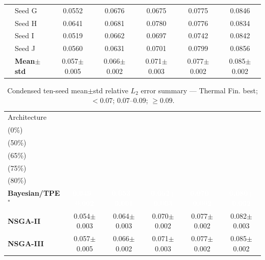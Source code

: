 \begin{table}[H]
{\begin{tabular}{@{}llccccc@{}}
  & Seed G & {\small 0.0552} & {\small 0.0676} & {\small 0.0675} & {\small 0.0775} & {\small 0.0846} \\
  & Seed H & {\small 0.0641} & {\small 0.0681} & {\small 0.0780} & {\small 0.0776} & {\small 0.0834} \\
  & Seed I & {\small 0.0519} & {\small 0.0662} & {\small 0.0697} & {\small 0.0742} & {\small 0.0842} \\
  & Seed J & {\small 0.0560} & {\small 0.0631} & {\small 0.0701} & {\small 0.0799} & {\small 0.0856} \\
 & \textbf{Mean$\pm$std} & \cellcolor{ForestGreen!25}0.057$\pm$0.005 & \cellcolor{ForestGreen!25}0.066$\pm$0.002 & \cellcolor{YellowGreen!30}0.071$\pm$0.003 & \cellcolor{YellowGreen!30}0.077$\pm$0.002 & \cellcolor{YellowGreen!30}0.085$\pm$0.002 \\
\bottomrule
\end{tabular}
}
\end{table}

\begin{table}[H]
\centering\small\setlength{\tabcolsep}{4pt}
\caption{Condensed ten-seed mean$\pm$std relative $L_2$ error summary --- Thermal Fin.
\phantom{x} best; \phantom{x} ${<}0.07$;
\phantom{x} $0.07$--$0.09$; \phantom{x} ${\geq}0.09$.}
\label{tab:l2_summary_thermal_fin}
\begin{tabular}{@{}lccccc@{}}
\toprule
Architecture & \makecell{$k{=}1$\\(0\%)} & \makecell{$k{=}2$\\(50\%)} & \makecell{$k{=}3$\\(65\%)} & \makecell{$k{=}4$\\(75\%)} & \makecell{$k{=}5$\\(80\%)} \\
\midrule
 \textbf{Bayesian/TPE$^*$} & \cellcolor{ForestGreen!55}\textcolor{white}{\textbf{0.049$\pm$0.002}} & \cellcolor{ForestGreen!55}\textcolor{white}{\textbf{0.053$\pm$0.001}} & \cellcolor{ForestGreen!55}\textcolor{white}{\textbf{0.062$\pm$0.003}} & \cellcolor{ForestGreen!55}\textcolor{white}{\textbf{0.070$\pm$0.002}} & \cellcolor{ForestGreen!55}\textcolor{white}{\textbf{0.080$\pm$0.002}} \\
 \textbf{NSGA-II} & \cellcolor{ForestGreen!25}0.054$\pm$0.003 & \cellcolor{ForestGreen!25}0.064$\pm$0.003 & \cellcolor{ForestGreen!25}0.070$\pm$0.002 & \cellcolor{YellowGreen!30}0.077$\pm$0.002 & \cellcolor{YellowGreen!30}0.082$\pm$0.003 \\
 \textbf{NSGA-III} & \cellcolor{ForestGreen!25}0.057$\pm$0.005 & \cellcolor{ForestGreen!25}0.066$\pm$0.002 & \cellcolor{YellowGreen!30}0.071$\pm$0.003 & \cellcolor{YellowGreen!30}0.077$\pm$0.002 & \cellcolor{YellowGreen!30}0.085$\pm$0.002 \\
\bottomrule
\end{tabular}
\end{table}


